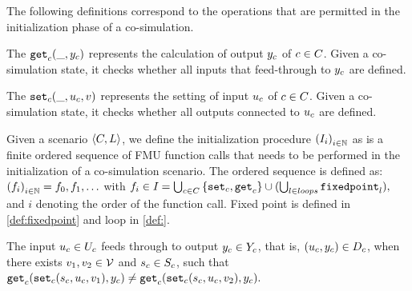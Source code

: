 The following definitions correspond to the operations that are permitted in the initialization phase of a co-simulation.
\begin{definition}\label{def:getout}
The $\mathtt{get}_{c}(\_, y_{c})$ represents the calculation of output $y_{c}$ of $c \in C$. Given a co-simulation state, it checks whether all inputs that feed-through to $y_{c}$ are defined.
\end{definition}

\begin{definition}\label{def:setin}
The $\mathtt{set}_{c}(\_, u_{c}, v)$ represents the setting of input $u_{c}$  of $c \in C$. Given a co-simulation state, it checks whether all outputs connected to $u_{c}$ are defined.
\end{definition}

\begin{definition}[Initialization]\label{def:initialization}
  Given a scenario $ \left\langle C, L \right\rangle $, we define the initialization procedure $ \left( I_i \right)_{i \in \mathbb{N}}$ as is a finite ordered sequence of FMU function calls that needs to be performed in the initialization of a co-simulation scenario. The ordered sequence is defined as: $ \left( f_i \right)_{i \in \mathbb{N}} = f_0, f_1, \ldots$ with
  $f_i \in I_{} = \bigcup_{c \in C}  \left\{ \mathtt{set}_{c},\mathtt{get}_{c} \right\} \cup (\bigcup_{l \in loops} \mathtt{fixedpoint}_{l}),$
  and $i$ denoting the order of the function call.
  Fixed point is defined in \cref{def:fixedpoint} and loop in \cref{def:}.
\end{definition}

\begin{definition}\label{def:feedthrough}
  The input $u_{c} \in U_{c}$ feeds through to output $y_{c} \in Y_{c}$, that is, $(u_{c},y_{c}) \in D_{c}$, when there exists $v_1, v_2 \in \mathcal{V}$ and $s_{c} \in S_{c}$, such that
  $
  \mathtt{get}_{c} (\mathtt{set}_{c}(s_{c}, u_{c}, v_1), y_{c}) \neq \mathtt{get}_{c} (\mathtt{set}_{c}(s_{c}, u_{c}, v_2), y_{c}).
  $
\end{definition}


